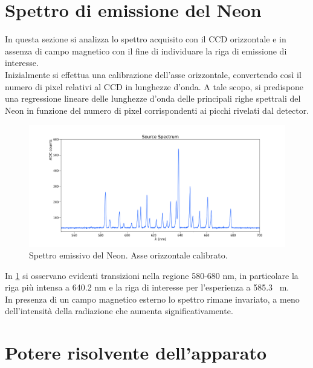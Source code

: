 \documentclass[twocolumn,10pt]{asme2ej}
\begin{document}
\section{Spettro di emissione del Neon}\label{s:neon}

In questa sezione si analizza lo spettro acquisito con il CCD orizzontale e in assenza di campo magnetico con il fine di
individuare la riga di emissione di interesse.  \\
Inizialmente si effettua una calibrazione dell'asse orizzontale, convertendo così il numero di pixel relativi al CCD in
lunghezze d'onda. A tale scopo, si predispone una regressione lineare delle lunghezze d'onda delle principali righe
spettrali del Neon in funzione del numero di pixel corrispondenti ai picchi rivelati dal detector. 
 
\begin{figure}
    \centering
    \includegraphics[width=\textwidth]{../Spectrum/SpectrumPlots/spettro1d_Boff.png}
    \caption{Spettro emissivo del Neon. Asse orizzontale calibrato.}
    \label{i:spettro1d}
\end{figure}

In \figurename\ref{i:spettro1d} si osservano evidenti transizioni nella regione 580-680 \si{\nano \metre}, in
particolare la riga più intensa a 640.2 \si{\nano \metre} e la riga di interesse per l'esperienza a 585.3 \si{\nano
\metre}.\\
In presenza di un campo magnetico esterno lo spettro rimane invariato, a meno dell'intensità della radiazione che
aumenta significativamente. 




\section{Potere risolvente dell'apparato}\label{s:risolvente}
\end{document}
